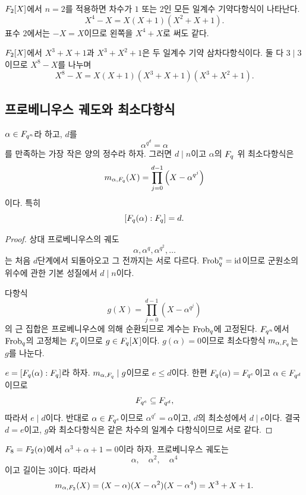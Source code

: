 \begin{example}
$F_2[X]$에서 $n=2$를 적용하면 차수가 $1$ 또는 $2$인 모든 일계수 기약다항식이 나타난다.
\[
  X^4-X=X(X+1)(X^2+X+1).
\]
표수 $2$에서는 $-X=X$이므로 왼쪽을 $X^4+X$로 써도 같다.
\end{example}

\begin{example}
$F_2[X]$에서 $X^3+X+1$과 $X^3+X^2+1$은 두 일계수 기약 삼차다항식이다. 둘 다 $3\mid3$이므로 $X^8-X$를 나누며
\[
  X^8-X=X(X+1)(X^3+X+1)(X^3+X^2+1).
\]
\end{example}

\subsection{프로베니우스 궤도와 최소다항식}

\begin{theorem}
$\alpha\in F_{q^n}$라 하고, $d$를
\[
  \alpha^{q^d}=\alpha
\]
를 만족하는 가장 작은 양의 정수라 하자. 그러면 $d\mid n$이고 $\alpha$의 $F_q$ 위 최소다항식은
\[
  m_{\alpha,F_q}(X)
  =\prod_{j=0}^{d-1}\left(X-\alpha^{q^j}\right)
\]
이다. 특히
\[
  [F_q(\alpha):F_q]=d.
\]
\end{theorem}

\begin{proof}
상대 프로베니우스의 궤도
\[
  \alpha,\alpha^q,\alpha^{q^2},\dots
\]
는 처음 $d$단계에서 되돌아오고 그 전까지는 서로 다르다. $\operatorname{Frob}_q^n=\operatorname{id}$이므로 군원소의 위수에 관한 기본 성질에서 $d\mid n$이다.

다항식
\[
  g(X)=\prod_{j=0}^{d-1}(X-\alpha^{q^j})
\]
의 근 집합은 프로베니우스에 의해 순환되므로 계수는 $\operatorname{Frob}_q$에 고정된다. $F_{q^n}$에서 $\operatorname{Frob}_q$의 고정체는 $F_q$이므로 $g\in F_q[X]$이다. $g(\alpha)=0$이므로 최소다항식 $m_{\alpha,F_q}$는 $g$를 나눈다.

$e=[F_q(\alpha):F_q]$라 하자. $m_{\alpha,F_q}\mid g$이므로 $e\le d$이다. 한편 $F_q(\alpha)=F_{q^e}$이고 $\alpha\in F_{q^d}$이므로
\[
  F_{q^e}\subseteq F_{q^d},
\]
따라서 $e\mid d$이다. 반대로 $\alpha\in F_{q^e}$이므로 $\alpha^{q^e}=\alpha$이고, $d$의 최소성에서 $d\mid e$이다. 결국 $d=e$이고, $g$와 최소다항식은 같은 차수의 일계수 다항식이므로 서로 같다.
\end{proof}

\begin{example}
$F_8=F_2(\alpha)$에서 $\alpha^3+\alpha+1=0$이라 하자. 프로베니우스 궤도는
\[
  \alpha,\quad\alpha^2,\quad\alpha^4
\]
이고 길이는 $3$이다. 따라서
\[
  m_{\alpha,F_2}(X)
  =(X-\alpha)(X-\alpha^2)(X-\alpha^4)
  =X^3+X+1.
\]
\end{example}

